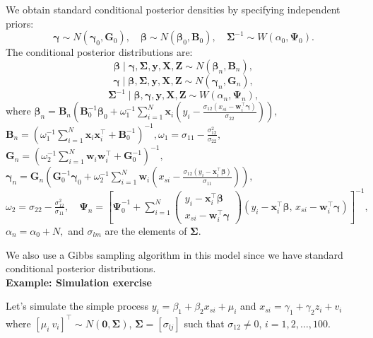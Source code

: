 We obtain standard conditional posterior densities by specifying independent priors:
\[
\bm{\gamma} \sim N(\bm{\gamma}_0, \bm{G}_0), 
\quad 
\bm{\beta} \sim N(\bm{\beta}_0, \bm{B}_0), 
\quad 
\bm{\Sigma}^{-1} \sim W(\alpha_0, \bm{\Psi}_0).
\]
The conditional posterior distributions are:
\begin{equation*}
	\bm{\beta} \mid \bm{\gamma}, \bm{\Sigma}, \bm{y}, \bm{X}, \bm{Z} \sim N(\bm{\beta}_n, \bm{B}_n),
\end{equation*}
\begin{equation*}
	\bm{\gamma} \mid \bm{\beta}, \bm{\Sigma}, \bm{y}, \bm{X}, \bm{Z} \sim N(\bm{\gamma}_n, \bm{G}_n),
\end{equation*}
\begin{equation*}
	\bm{\Sigma}^{-1} \mid \bm{\beta}, \bm{\gamma}, \bm{y}, \bm{X}, \bm{Z} \sim W(\alpha_n, \bm{\Psi}_n),
\end{equation*}
where
\(
\bm{\beta}_n = \bm{B}_n \left( \bm{B}_0^{-1} \bm{\beta}_0 
+ \omega_1^{-1} \sum_{i=1}^{N} 
\bm{x}_i \left( y_i - \frac{\sigma_{12}(x_{si} - \bm{w}_i^{\top}\bm{\gamma})}{\sigma_{22}} \right) \right),
\)
\(
\bm{B}_n = \left( \omega_1^{-1} \sum_{i=1}^{N} \bm{x}_i \bm{x}_i^{\top} + \bm{B}_0^{-1} \right)^{-1}, \omega_1 = \sigma_{11} - \frac{\sigma_{12}^2}{\sigma_{22}},
\)
\(
\bm{G}_n = \left( \omega_2^{-1} \sum_{i=1}^{N} \bm{w}_i \bm{w}_i^{\top} + \bm{G}_0^{-1} \right)^{-1},\) 
\(\bm{\gamma}_n = \bm{G}_n \left( \bm{G}_0^{-1} \bm{\gamma}_0 
+ \omega_2^{-1} \sum_{i=1}^{N} 
\bm{w}_i \left( x_{si} - \frac{\sigma_{12}(y_i - \bm{x}_i^{\top}\bm{\beta})}{\sigma_{11}} \right) \right),
\)
\(
\omega_2 = \sigma_{22} - \frac{\sigma_{12}^2}{\sigma_{11}}, 
\quad 
\bm{\Psi}_n = \left[ \bm{\Psi}_0^{-1} 
+ \sum_{i=1}^N 
\begin{pmatrix} 
	y_i - \bm{x}_i^{\top}\bm{\beta} \\ 
	x_{si} - \bm{w}_i^{\top}\bm{\gamma} 
\end{pmatrix} 
(y_i - \bm{x}_i^{\top}\bm{\beta},\, x_{si} - \bm{w}_i^{\top}\bm{\gamma}) 
\right]^{-1},
\)
\(
\alpha_n = \alpha_0 + N,
\) and $\sigma_{lm}$ are the elements of $\bm{\Sigma}$.

We also use a Gibbs sampling algorithm in this model since we have standard conditional posterior distributions.\\

\textbf{Example: Simulation exercise}

Let's simulate the simple process $y_i=\beta_1+\beta_2x_{si}+\mu_i$ and $x_{si}=\gamma_1+\gamma_2z_i+v_i$ where $[\mu_i \ v_i]^{\top}\sim N(\bm{0},\bm{\Sigma})$, $\bm{\Sigma}=[\sigma_{lj}]$ such that $\sigma_{12}\neq 0$, $i=1,2,\dots,100$.

